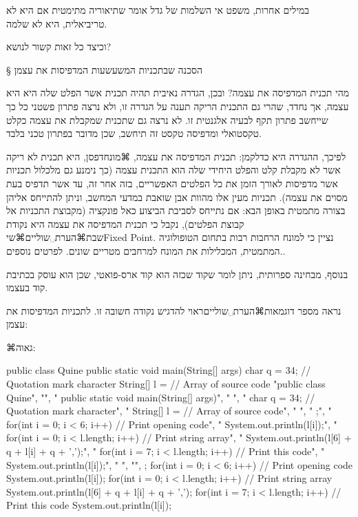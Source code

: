 { במילים אחרות, משפט אי השלמות של גדל אומר שתיאוריה מתימטית אם היא לא טריביאלית, היא לא שלמה. 

וכיצד כל זאות קשור לנושא?



§ הסכנה שבתכניות המשעשעות המדפיסות את עצמן

מהי תכנית המדפיסה את עצמה? ובכן, הגדרה נאיבית תהיה תכנית אשר הפלט שלה היא היא עצמה, אך נחדד, שהרי גם התכנית הריקה תענה על הגדרה זו, ולא נרצה פתרון פשטני כל כך שייחשב פתרון תקף לבעיה אלגנטית זו. לא נרצה גם שתכנית שמקבלת את עצמה כקלט טקסטואלי ומדפיסה טקסט זה תיחשב, שכן מדובר בפתרון טכני בלבד. 

לפיכך, ההגדרה היא כדלקמן: תכנית המדפיסה את עצמה, ⌘מונח{דפסן}, היא תכנית לא ריקה אשר לא מקבלת קלט והפלט היחידי שלה הוא התכנית עצמה (כך נימנע גם מלכלול תכניות אשר מדפיסות לאורך הזמן את כל הפלטים האפשריים, בזה אחר זה, עד אשר תדפיס בעת מסוים את עצמה). תכניות מעין אלו מהוות אבן שואבת במדעי המחשב, וניתן להתייחס אליהן בצורה מתמטית באופן הבא: אם נתייחס לסביבת הביצוע כאל פונקציה (מקבוצת התכניות אל קבוצת הפלטים), נקבל כי תכנית המדפיסה את עצמה היא נקודת שבת⌘הערת␣שוליים{⌘שי{Fixed Point}. נציין כי למונח הרחבות רבות בתחום הטופולוגיה המתמטית, המכלילות את המונח למרחבים מטריים שונים. לפרטים נוספים.}. 

בנוסף, מבחינה ספרותית, ניתן לומר שקוד שכזה הוא קוד ארס-פואטי, שכן הוא עוסק בכתיבת קוד בעצמו. 

נראה מספר דוגמאות⌘הערת␣שוליים{ראוי להדגיש נקודה חשובה זו.} לתכניות המדפיסות את עצמן:

⌘גאוה:
\begin{JAVAn}
public class Quine
{
  public static void main(String[] args)
  {
    char q = 34;      // Quotation mark character
    String[] l = {    // Array of source code
    "public class Quine",
    "{",
    "  public static void main(String[] args)",
    "  {",
    "    char q = 34;      // Quotation mark character",
    "    String[] l = {    // Array of source code",
    "    ",
    "    };",
    "    for(int i = 0; i < 6; i++)           // Print opening code",
    "        System.out.println(l[i]);",
    "    for(int i = 0; i < l.length; i++)    // Print string array",
    "        System.out.println(l[6] + q + l[i] + q + ',');",
    "    for(int i = 7; i < l.length; i++)    // Print this code",
    "        System.out.println(l[i]);",
    "  }",
    "}",
    };
    for(int i = 0; i < 6; i++)           // Print opening code
        System.out.println(l[i]);
    for(int i = 0; i < l.length; i++)    // Print string array
        System.out.println(l[6] + q + l[i] + q + ',');
    for(int i = 7; i < l.length; i++)    // Print this code
        System.out.println(l[i]);
  }
}
\end{JAVAn}


}
